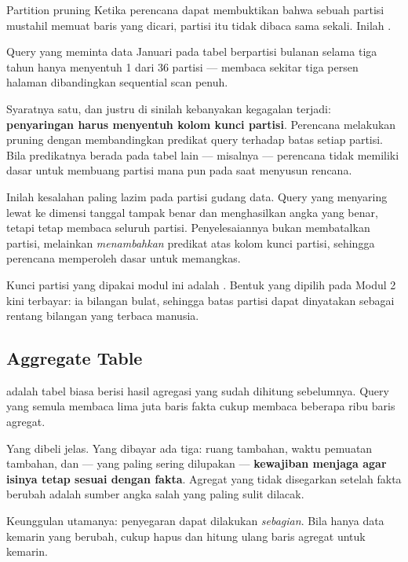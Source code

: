 \begin{konsep}{Partition pruning}
Ketika perencana dapat membuktikan bahwa sebuah partisi mustahil memuat baris
yang dicari, partisi itu tidak dibaca sama sekali. Inilah .

Query yang meminta data Januari pada tabel berpartisi bulanan selama tiga
tahun hanya menyentuh 1 dari 36 partisi --- membaca sekitar tiga persen
halaman dibandingkan sequential scan penuh.
\end{konsep}

Syaratnya satu, dan justru di sinilah kebanyakan kegagalan terjadi:
\textbf{penyaringan harus menyentuh kolom kunci partisi}. Perencana melakukan
pruning dengan membandingkan predikat query terhadap batas setiap partisi. Bila
predikatnya berada pada tabel lain --- misalnya
 --- perencana tidak memiliki dasar untuk
membuang partisi mana pun pada saat menyusun rencana.

\begin{peringatan}
Inilah kesalahan paling lazim pada partisi gudang data. Query yang menyaring
lewat  ke dimensi tanggal tampak benar dan menghasilkan angka
yang benar, tetapi tetap membaca seluruh partisi. Penyelesaiannya bukan
membatalkan partisi, melainkan \emph{menambahkan} predikat atas kolom kunci
partisi, sehingga perencana memperoleh dasar untuk memangkas.
\end{peringatan}

Kunci partisi yang dipakai modul ini adalah . Bentuk
 yang dipilih pada Modul 2 kini terbayar: ia bilangan bulat,
sehingga batas partisi dapat dinyatakan sebagai rentang bilangan yang terbaca
manusia.

\subsection{Aggregate Table}

 adalah tabel biasa berisi hasil agregasi yang sudah
dihitung sebelumnya. Query yang semula membaca lima juta baris fakta cukup
membaca beberapa ribu baris agregat.

Yang dibeli jelas. Yang dibayar ada tiga: ruang tambahan, waktu pemuatan
tambahan, dan --- yang paling sering dilupakan --- \textbf{kewajiban menjaga
agar isinya tetap sesuai dengan fakta}. Agregat yang tidak disegarkan setelah
fakta berubah adalah sumber angka salah yang paling sulit dilacak.

Keunggulan utamanya: penyegaran dapat dilakukan \emph{sebagian}. Bila hanya
data kemarin yang berubah, cukup hapus dan hitung ulang baris agregat untuk
kemarin.


